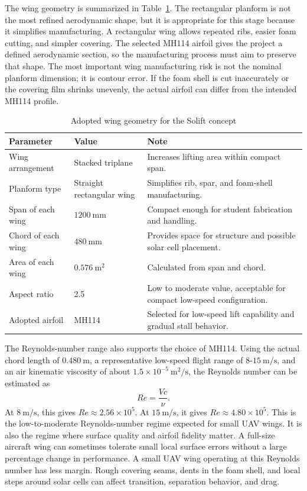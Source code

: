 The wing geometry is summarized in Table~\ref{tab:wing-geometry}. The rectangular planform is not the most refined aerodynamic shape, but it is appropriate for this stage because it simplifies manufacturing. A rectangular wing allows repeated ribs, easier foam cutting, and simpler covering. The selected MH114 airfoil gives the project a defined aerodynamic section, so the manufacturing process must aim to preserve that shape. The most important wing manufacturing risk is not the nominal planform dimension; it is contour error. If the foam shell is cut inaccurately or the covering film shrinks unevenly, the actual airfoil can differ from the intended MH114 profile.

\begin{table}[htbp]
    \centering
    \caption{Adopted wing geometry for the Solift concept}
    \label{tab:wing-geometry}
    \begin{tabular}{p{} p{} p{}}
        \toprule
        Parameter & Value & Note \\
        \midrule
        Wing arrangement &
        Stacked triplane &
        Increases lifting area within compact span. \\
        Planform type &
        Straight rectangular wing &
        Simplifies rib, spar, and foam-shell manufacturing. \\
        Span of each wing &
        \(1200~\mathrm{mm}\) &
        Compact enough for student fabrication and handling. \\
        Chord of each wing &
        \(480~\mathrm{mm}\) &
        Provides space for structure and possible solar cell placement. \\
        Area of each wing &
        \(0.576~\mathrm{m^2}\) &
        Calculated from span and chord. \\
        Aspect ratio &
        2.5 &
        Low to moderate value, acceptable for compact low-speed configuration. \\
        Adopted airfoil &
        MH114 &
        Selected for low-speed lift capability and gradual stall behavior. \\
        \bottomrule
    \end{tabular}
\end{table}

The Reynolds-number range also supports the choice of MH114. Using the actual chord length of \(0.480~\mathrm{m}\), a representative low-speed flight range of \(8\)-\(15~\mathrm{m/s}\), and an air kinematic viscosity of about \(1.5 \times 10^{-5}~\mathrm{m^2/s}\), the Reynolds number can be estimated as
\[
    Re = \frac{Vc}{\nu}.
\]
At \(8~\mathrm{m/s}\), this gives \(Re \approx 2.56 \times 10^5\). At \(15~\mathrm{m/s}\), it gives \(Re \approx 4.80 \times 10^5\). This is the low-to-moderate Reynolds-number regime expected for small UAV wings. It is also the regime where surface quality and airfoil fidelity matter. A full-size aircraft wing can sometimes tolerate small local surface errors without a large percentage change in performance. A small UAV wing operating at this Reynolds number has less margin. Rough covering seams, dents in the foam shell, and local steps around solar cells can affect transition, separation behavior, and drag.

